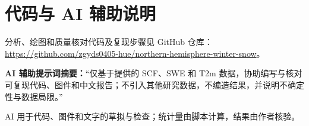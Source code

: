 \section{代码与 AI 辅助说明}

分析、绘图和质量核对代码及复现步骤见 GitHub 仓库：\url{https://github.com/zgyds0405-hue/northern-hemisphere-winter-snow}。

\textbf{AI 辅助提示词摘要：}“仅基于提供的 SCF、SWE 和 T2m 数据，协助编写与核对可复现代码、图件和中文报告；不引入其他研究数据，不编造结果，并说明不确定性与数据局限。”

AI 用于代码、图件和文字的草拟与检查；统计量由脚本计算，结果由作者核验。
